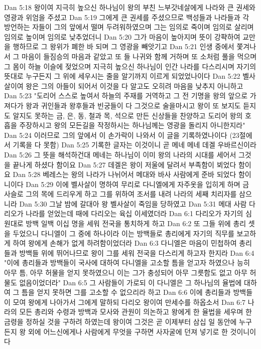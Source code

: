 Dan 5:18  왕이여 지극히 높으신 하나님이 왕의 부친 느부갓네살에게 나라와 큰 권세와 영광과 위엄을 주셨고
Dan 5:19  그에게 큰 권세를 주셨으므로 백성들과 나라들과 각 방언하는 자들이 그의 앞에서 떨며 두려워하였으며 그는 임의로 죽이며 임의로 살리며 임의로 높이며 임의로 낮추었더니
Dan 5:20  그가 마음이 높아지며 뜻이 강퍅하여 교만을 행하므로 그 왕위가 폐한 바 되며 그 영광을 빼앗기고
Dan 5:21  인생 중에서 쫓겨나서 그 마음이 들짐승의 마음과 같았고 또 들 나귀와 함께 거하며 또 소처럼 풀을 먹으며 그 몸이 하늘 이슬에 젖었으며 지극히 높으신 하나님이 인간 나라를 다스리시며 자기의 뜻대로 누구든지 그 위에 세우시는 줄을 알기까지 이르게 되었었나이다
Dan 5:22  벨사살이여 왕은 그의 아들이 되어서 이것을 다 알고도 오히려 마음을 낮추지 아니하고
Dan 5:23  "도리어 스스로 높여서 하늘의 주재를 거역하고 그 전 기명을 왕의 앞으로 가져다가 왕과 귀인들과 왕후들과 빈궁들이 다 그것으로 술을마시고 왕이 또 보지도 듣지도 알지도 못하는 금, 은, 동, 철과 목, 석으로 만든 신상들을 찬양하고 도리어 왕의 호흡을 주장하시고 왕의 모든길을 작정하시는 하나님께는 영광을 돌리지 아니한지라"
Dan 5:24  이러므로 그의 앞에서 이 손가락이 나와서 이 글을 기록하였나이다 (23절에서 기록을 다 못함)
Dan 5:25  기록한 글자는 이것이니 곧 메네 메네 데겔 우바르신이라
Dan 5:26  그 뜻을 해석하건대 메네는 하나님이 이미 왕의 나라의 시대를 세어서 그것을 끝나게 하셨다 함이요
Dan 5:27  데겔은 왕이 저울에 달려서 부족함이 뵈었다 함이요
Dan 5:28  베레스는 왕의 나라가 나뉘어서 메대와 바사 사람에게 준바 되었다 함이니이다
Dan 5:29  이에 벨사살이 명하여 무리로 다니엘에게 자주옷을 입히게 하며 금 사슬로 그의 목에 드리우게 하고 그를 위하여 조서를 내려 나라의 세째 치리자를 삼으니라
Dan 5:30  그날 밤에 갈대아 왕 벨사살이 죽임을 당하였고
Dan 5:31  메대 사람 다리오가 나라를 얻었는데 때에 다리오는 육십 이세였더라
Dan 6:1  다리오가 자기의 심원대로 방백 일백 이십 명을 세워 전국을 통치하게 하고
Dan 6:2  또 그들 위에 총리 셋을 두었으니 다니엘이 그 중에 하나이라 이는 방백들로 총리에게 자기의 직무를 보고하게 하여 왕에게 손해가 없게 하려함이었더라
Dan 6:3  다니엘은 마음이 민첩하여 총리들과 방백들 위에 뛰어나므로 왕이 그를 세워 전국을 다스리게 하고자 한지라
Dan 6:4  "이에 총리들과 방백들이 국사에 대하여 다니엘을 고소할 틈을 얻고자 하였으나 능히 아무 틈, 아무 허물을 얻지 못하였으니 이는 그가 충성되어 아무 그릇함도 없고 아무 허물도 없음이었더라"
Dan 6:5  그 사람들이 가로되 이 다니엘은 그 하나님의 율법에 대하여 그 틈을 얻지 못하면 그를 고소할 수 없으리라 하고
Dan 6:6  이에 총리들과 방백들이 모여 왕에게 나아가서 그에게 말하되 다리오 왕이여 만세수를 하옵소서
Dan 6:7  나라의 모든 총리와 수령과 방백과 모사와 관원이 의논하고 왕에게 한 율법을 세우며 한 금령을 정하실 것을 구하려 하였는데 왕이여 그것은 곧 이제부터 삼십 일 동안에 누구든지 왕 외에 어느신에게나 사람에게 무엇을 구하면 사자굴에 던져 넣기로 한 것이니이다
